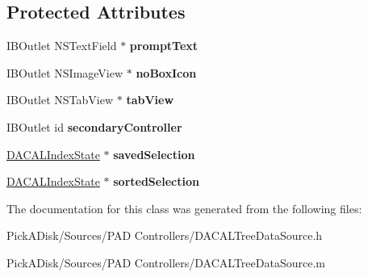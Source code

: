 \subsection*{Protected Attributes}
\begin{DoxyCompactItemize}
\item 
\hypertarget{interface_d_a_c_a_l_tree_data_source_a3248d26d67d1ac97bbcbfb281192a152}{
IBOutlet NSTextField $\ast$ {\bfseries promptText}}
\label{interface_d_a_c_a_l_tree_data_source_a3248d26d67d1ac97bbcbfb281192a152}

\item 
\hypertarget{interface_d_a_c_a_l_tree_data_source_acdabc03990d5a0de446069f8c64cd81d}{
IBOutlet NSImageView $\ast$ {\bfseries noBoxIcon}}
\label{interface_d_a_c_a_l_tree_data_source_acdabc03990d5a0de446069f8c64cd81d}

\item 
\hypertarget{interface_d_a_c_a_l_tree_data_source_a7dac5c50914163cff3859fe97bae7297}{
IBOutlet NSTabView $\ast$ {\bfseries tabView}}
\label{interface_d_a_c_a_l_tree_data_source_a7dac5c50914163cff3859fe97bae7297}

\item 
\hypertarget{interface_d_a_c_a_l_tree_data_source_a13cea929df5f5e15e34c35206b6aa7c0}{
IBOutlet id {\bfseries secondaryController}}
\label{interface_d_a_c_a_l_tree_data_source_a13cea929df5f5e15e34c35206b6aa7c0}

\item 
\hypertarget{interface_d_a_c_a_l_tree_data_source_afc7930379cecfc49994f70104ae3abe6}{
\hyperlink{interface_d_a_c_a_l_index_state}{DACALIndexState} $\ast$ {\bfseries savedSelection}}
\label{interface_d_a_c_a_l_tree_data_source_afc7930379cecfc49994f70104ae3abe6}

\item 
\hypertarget{interface_d_a_c_a_l_tree_data_source_a5f5060a42d36095e5f3f838ab8c05de4}{
\hyperlink{interface_d_a_c_a_l_index_state}{DACALIndexState} $\ast$ {\bfseries sortedSelection}}
\label{interface_d_a_c_a_l_tree_data_source_a5f5060a42d36095e5f3f838ab8c05de4}

\end{DoxyCompactItemize}


The documentation for this class was generated from the following files:\begin{DoxyCompactItemize}
\item 
PickADisk/Sources/PAD Controllers/DACALTreeDataSource.h\item 
PickADisk/Sources/PAD Controllers/DACALTreeDataSource.m\end{DoxyCompactItemize}

